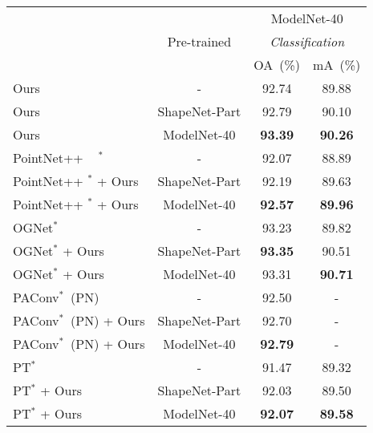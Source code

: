 \documentclass[journal]{IEEEtran}
\begin{document}
\begin{table}[t]
\footnotesize
\setlength{\tabcolsep}{2.8pt}
\begin{center}
\vspace{-0.2cm}
\setlength{\tabcolsep}{2.3mm} {
\begin{tabular}{l|c|c|c}
\shline
\multirow{3}{*}{Methods}&
\multirow{3}{*}{Pre-trained}& 
\multicolumn{2}{c}{ModelNet-40} \\
& & \multicolumn{2}{c}{\emph{Classification}} \\
\cline{3-4}
& & OA~(\%) & mA~(\%) \\
\shline
Ours & -             & 92.74 & 89.88 \\
Ours & ShapeNet-Part & 92.79 & 90.10 \\
Ours & ModelNet-40   &  \textbf{93.39} & \textbf{90.26} \\
\hline
PointNet++ ~\cite{qi2017pointnet++} $^*$ & - & 92.07 & 88.89 \\
PointNet++  $^*$ + Ours & ShapeNet-Part & 92.19 & 89.63 \\
PointNet++  $^*$ + Ours & ModelNet-40 & \textbf{92.57} & \textbf{89.96} \\
\hline
OGNet$^*$ ~\cite{zheng2020parameter} & - & 93.23 & 89.82 \\
OGNet$^*$ + Ours  & ShapeNet-Part & \textbf{93.35} & 90.51 \\
OGNet$^*$ + Ours & ModelNet-40 & 93.31 & \textbf{90.71} \\
\hline
{\color{black}PAConv$^*$~(PN)} ~\cite{xu2021paconv} & {\color{black}-} & {\color{black}92.50} & {\color{black}-} \\
{\color{black}PAConv$^*$~(PN) + Ours}  & {\color{black}ShapeNet-Part} & {\color{black}92.70} & {\color{black}-} \\
{\color{black}PAConv$^*$~(PN) + Ours} & {\color{black}ModelNet-40} & {\color{black}\textbf{92.79}} & {\color{black}-} \\

\hline
{\color{black}PT$^*$} ~\cite{zhao2021point} & {\color{black}-} & {\color{black}91.47} & {\color{black}89.32} \\
{\color{black}PT$^*$} + {\color{black}Ours}  & {\color{black}ShapeNet-Part} & {\color{black}92.03} & {\color{black}89.50} \\
{\color{black}PT$^*$ + Ours} & {\color{black}ModelNet-40} & {\color{black}\textbf{92.07}} & {\color{black}\textbf{89.58}} \\


\end{tabular}}
\end{center}
\end{table}
\end{document}
